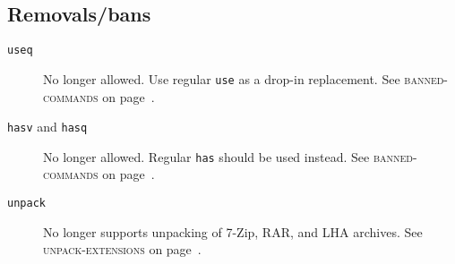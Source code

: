 \documentclass[a4paper,nofoldmark]{leaflet}
\newcommand{\code}[1]{\texttt{#1}}
\newcommand{\featureref}[1]{\textsc{#1} on page~\pageref{feat:#1}}
\begin{document}
\subsection{Removals/bans}
\label{sec:cs:eapi8-removalsbans}
\begin{description}
    \item[\code{useq}] No longer allowed. Use regular \code{use} as
    a drop-in replacement. See \featureref{banned-commands}.
    \item[\code{hasv} and \code{hasq}] No longer allowed. Regular
    \code{has} should be used instead.
    See \featureref{banned-commands}.
    \item[\code{unpack}] No longer supports unpacking of 7-Zip, RAR,
    and LHA archives. See \featureref{unpack-extensions}.
\end{description}
\end{document}
